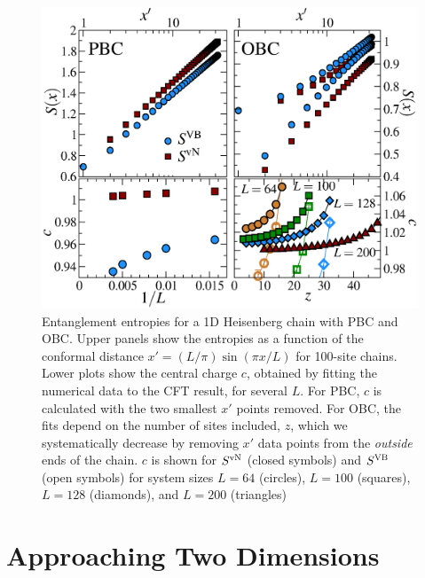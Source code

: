 \begin{figure} {
\includegraphics[width=6.5in]{./figures/paper1/figure1/4-panelFIG1.eps} 
\centering
\caption[1D Results for VB EE and von Neumann EE]{
{\color{red}
Entanglement entropies for a 1D Heisenberg chain with PBC and OBC. Upper
panels show the entropies as a function of the conformal distance $x'  = (L/\pi)\sin (\pi x/L)$ for
100-site chains.  Lower plots show the central
charge $c$, obtained by fitting the numerical data to the CFT result, for
several $L$.  For PBC, $c$ is calculated with the two smallest $x'$ points
removed.  For OBC, the fits depend on the number of sites included, $z$,
which we systematically decrease by removing $x'$ data points from the
{\it outside} ends of the chain.  $c$ is shown for $S^{\rm vN}$
(closed symbols) and $S^{\rm VB}$ (open symbols) for system sizes $L=64$
(circles), $L=100$ (squares), $L=128$ (diamonds), and $L=200$ (triangles)
\label{1D}}
} }
\end{figure}



\section{Approaching Two Dimensions}

